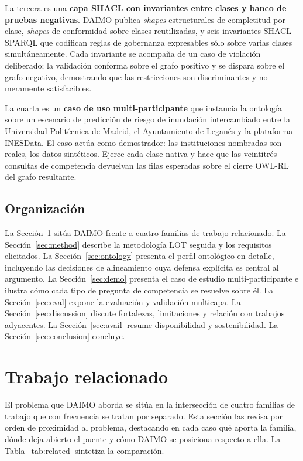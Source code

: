 \documentclass[11pt,a4paper]{article}
\begin{document}
La tercera es una \textbf{capa SHACL con invariantes entre clases y banco de pruebas negativas}. DAIMO publica \emph{shapes} estructurales de completitud por clase, \emph{shapes} de conformidad sobre clases reutilizadas, y seis invariantes SHACL-SPARQL que codifican reglas de gobernanza expresables sólo sobre varias clases simultáneamente. Cada invariante se acompaña de un caso de violación deliberado; la validación conforma sobre el grafo positivo y se dispara sobre el grafo negativo, demostrando que las restricciones son discriminantes y no meramente satisfacibles.

La cuarta es un \textbf{caso de uso multi-participante} que instancia la ontología sobre un escenario de predicción de riesgo de inundación intercambiado entre la Universidad Politécnica de Madrid, el Ayuntamiento de Leganés y la plataforma INESData. El caso actúa como demostrador: las instituciones nombradas son reales, los datos sintéticos. Ejerce cada clase nativa y hace que las veintitrés consultas de competencia devuelvan las filas esperadas sobre el cierre OWL-RL del grafo resultante.

\subsection{Organización}

La Sección~\ref{sec:related} sitúa DAIMO frente a cuatro familias de trabajo relacionado. La Sección~\ref{sec:method} describe la metodología LOT seguida y los requisitos elicitados. La Sección~\ref{sec:ontology} presenta el perfil ontológico en detalle, incluyendo las decisiones de alineamiento cuya defensa explícita es central al argumento. La Sección~\ref{sec:demo} presenta el caso de estudio multi-participante e ilustra cómo cada tipo de pregunta de competencia se resuelve sobre él. La Sección~\ref{sec:eval} expone la evaluación y validación multicapa. La Sección~\ref{sec:discussion} discute fortalezas, limitaciones y relación con trabajos adyacentes. La Sección~\ref{sec:avail} resume disponibilidad y sostenibilidad. La Sección~\ref{sec:conclusion} concluye.

\section{Trabajo relacionado}\label{sec:related}

El problema que DAIMO aborda se sitúa en la intersección de cuatro familias de trabajo que con frecuencia se tratan por separado. Esta sección las revisa por orden de proximidad al problema, destacando en cada caso qué aporta la familia, dónde deja abierto el puente y cómo DAIMO se posiciona respecto a ella. La Tabla~\ref{tab:related} sintetiza la comparación.
\end{document}
